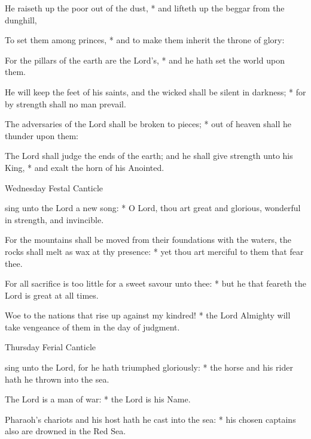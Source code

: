 \begin{multicols}{2}
He raiseth up the poor out of the dust, * and lifteth up the beggar from the dunghill,\par
To set them among princes, * and to make them inherit the throne of glory:\par
For the pillars of the earth are the Lord's, * and he hath set the world upon them.\par
He will keep the feet of his saints, {\dag} and the wicked shall be silent in darkness; * for by strength shall no man prevail.\par
The adversaries of the Lord shall be broken to pieces; * out of heaven shall he thunder upon them:\par
The Lord shall judge the ends of the earth; {\dag} and he shall give strength unto his King, * and exalt the horn of his Anointed.
\begin{inhead}
Wednesday Festal Canticle
\end{inhead}
 sing unto the Lord a new song: * O Lord, thou art great and glorious, wonderful in strength, and invincible.\par
{}
For the mountains shall be moved from their foundations with the waters, {\dag} the rocks shall melt as wax at thy presence: * yet thou art merciful to them that fear thee.\par
For all sacrifice is too little for a sweet savour unto thee: * but he that feareth the Lord is great at all times.\par
Woe to the nations that rise up against my kindred! * the Lord Almighty will take vengeance of them in the day of judgment.
\begin{inhead}
Thursday Ferial Canticle
\end{inhead}
 sing unto the Lord, for he hath triumphed gloriously: * the horse and his rider hath he thrown into the sea.\par
{}
The Lord is a man of war: * the Lord is his Name.\par
Pharaoh’s chariots and his host hath he cast into the sea: * his chosen captains also are drowned in the Red Sea.\par

\end{multicols}
